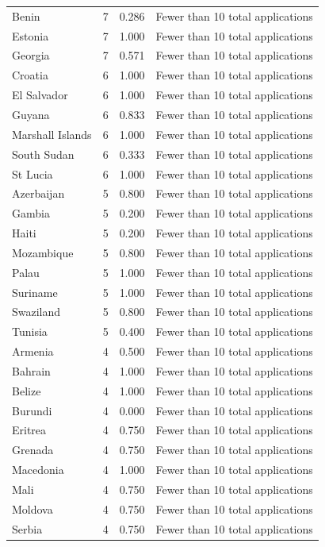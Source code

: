\documentclass[runningheads]{llncs}
\begin{document}
{\begin{longtable}{p{}rrp{}}
Benin & 7 & 0.286 & Fewer than 10 total applications \\
Estonia & 7 & 1.000 & Fewer than 10 total applications \\
Georgia & 7 & 0.571 & Fewer than 10 total applications \\
Croatia & 6 & 1.000 & Fewer than 10 total applications \\
El Salvador & 6 & 1.000 & Fewer than 10 total applications \\
Guyana & 6 & 0.833 & Fewer than 10 total applications \\
Marshall Islands & 6 & 1.000 & Fewer than 10 total applications \\
South Sudan & 6 & 0.333 & Fewer than 10 total applications \\
St Lucia & 6 & 1.000 & Fewer than 10 total applications \\
Azerbaijan & 5 & 0.800 & Fewer than 10 total applications \\
Gambia & 5 & 0.200 & Fewer than 10 total applications \\
Haiti & 5 & 0.200 & Fewer than 10 total applications \\
Mozambique & 5 & 0.800 & Fewer than 10 total applications \\
Palau & 5 & 1.000 & Fewer than 10 total applications \\
Suriname & 5 & 1.000 & Fewer than 10 total applications \\
Swaziland & 5 & 0.800 & Fewer than 10 total applications \\
Tunisia & 5 & 0.400 & Fewer than 10 total applications \\
Armenia & 4 & 0.500 & Fewer than 10 total applications \\
Bahrain & 4 & 1.000 & Fewer than 10 total applications \\
Belize & 4 & 1.000 & Fewer than 10 total applications \\
Burundi & 4 & 0.000 & Fewer than 10 total applications \\
Eritrea & 4 & 0.750 & Fewer than 10 total applications \\
Grenada & 4 & 0.750 & Fewer than 10 total applications \\
Macedonia & 4 & 1.000 & Fewer than 10 total applications \\
Mali & 4 & 0.750 & Fewer than 10 total applications \\
Moldova & 4 & 0.750 & Fewer than 10 total applications \\
Serbia & 4 & 0.750 & Fewer than 10 total applications \\

\end{longtable}}
\end{document}
